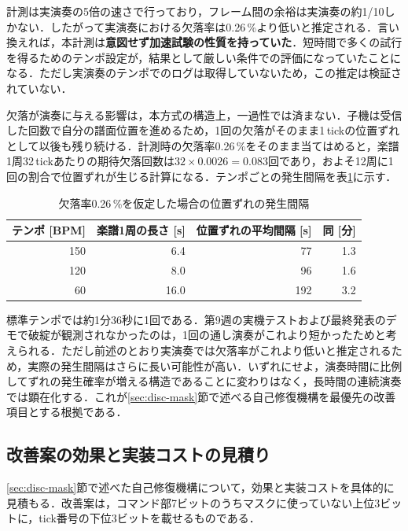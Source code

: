 \documentclass[uplatex,dvipdfmx]{jlreq}
\begin{document}
計測は実演奏の5倍の速さで行っており，フレーム間の余裕は実演奏の約1/10しかない．したがって実演奏における欠落率は0.26\,\%より低いと推定される．言い換えれば，本計測は\textbf{意図せず加速試験の性質を持っていた}．短時間で多くの試行を得るためのテンポ設定が，結果として厳しい条件での評価になっていたことになる．ただし実演奏のテンポでのログは取得していないため，この推定は検証されていない．

欠落が演奏に与える影響は，本方式の構造上，一過性では済まない．子機は受信した回数で自分の譜面位置を進めるため，1回の欠落がそのまま1\,tickの位置ずれとして以後も残り続ける．計測時の欠落率0.26\,\%をそのまま当てはめると，楽譜1周32\,tickあたりの期待欠落回数は$32 \times 0.0026 = 0.083$回であり，およそ12周に1回の割合で位置ずれが生じる計算になる．テンポごとの発生間隔を表\ref{tab:drift-rate}に示す．

\begin{table}[tb]
\caption{欠落率0.26\,\%を仮定した場合の位置ずれの発生間隔}
\label{tab:drift-rate}
\begin{center}
\small
\begin{tabular}{rrrr}
\hline
テンポ [BPM] & 楽譜1周の長さ [s] & 位置ずれの平均間隔 [s] & 同 [分] \\
\hline
150 & 6.4 & 77 & 1.3 \\
120 & 8.0 & 96 & 1.6 \\
60 & 16.0 & 192 & 3.2 \\
\hline
\end{tabular}
\end{center}
\end{table}

標準テンポでは約1分36秒に1回である．第9週の実機テストおよび最終発表のデモで破綻が観測されなかったのは，1回の通し演奏がこれより短かったためと考えられる．ただし前述のとおり実演奏では欠落率がこれより低いと推定されるため，実際の発生間隔はさらに長い可能性が高い．いずれにせよ，演奏時間に比例してずれの発生確率が増える構造であることに変わりはなく，長時間の連続演奏では顕在化する．これが\ref{sec:disc-mask}節で述べる自己修復機構を最優先の改善項目とする根拠である．

\subsection{改善案の効果と実装コストの見積り}
\label{sec:disc-fix}

\ref{sec:disc-mask}節で述べた自己修復機構について，効果と実装コストを具体的に見積もる．改善案は，コマンド部7ビットのうちマスクに使っていない上位3ビットに，tick番号の下位3ビットを載せるものである．
\end{document}

